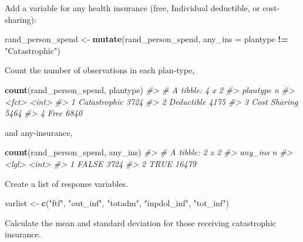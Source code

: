 \documentclass[]{book}
\newenvironment{Shaded}{\begin{snugshade}}{\end{snugshade}}
\newcommand{\CommentTok}[1]{\textcolor[rgb]{0.56,0.35,0.01}{\textit{#1}}}
\newcommand{\DataTypeTok}[1]{\textcolor[rgb]{0.13,0.29,0.53}{#1}}
\newcommand{\KeywordTok}[1]{\textcolor[rgb]{0.13,0.29,0.53}{\textbf{#1}}}
\newcommand{\NormalTok}[1]{#1}
\newcommand{\OperatorTok}[1]{\textcolor[rgb]{0.81,0.36,0.00}{\textbf{#1}}}
\newcommand{\StringTok}[1]{\textcolor[rgb]{0.31,0.60,0.02}{#1}}
\theoremstyle{definition}
\theoremstyle{definition}
\theoremstyle{definition}
\theoremstyle{remark}
\begin{document}
Add a variable for any health insurance (free, Individual deductible, or
cost-sharing):

\begin{Shaded}
\begin{Highlighting}[]
\NormalTok{rand_person_spend <-}\StringTok{ }\KeywordTok{mutate}\NormalTok{(rand_person_spend,}
                            \DataTypeTok{any_ins =}\NormalTok{ plantype }\OperatorTok{!=}\StringTok{ "Catastrophic"}\NormalTok{)}
\end{Highlighting}
\end{Shaded}

Count the number of observations in each plan-type,

\begin{Shaded}
\begin{Highlighting}[]
\KeywordTok{count}\NormalTok{(rand_person_spend, plantype)}
\CommentTok{#> # A tibble: 4 x 2}
\CommentTok{#>   plantype         n}
\CommentTok{#>   <fct>        <int>}
\CommentTok{#> 1 Catastrophic  3724}
\CommentTok{#> 2 Deductible    4175}
\CommentTok{#> 3 Cost Sharing  5464}
\CommentTok{#> 4 Free          6840}
\end{Highlighting}
\end{Shaded}

and any-insurance,

\begin{Shaded}
\begin{Highlighting}[]
\KeywordTok{count}\NormalTok{(rand_person_spend, any_ins)}
\CommentTok{#> # A tibble: 2 x 2}
\CommentTok{#>   any_ins     n}
\CommentTok{#>   <lgl>   <int>}
\CommentTok{#> 1 FALSE    3724}
\CommentTok{#> 2 TRUE    16479}
\end{Highlighting}
\end{Shaded}

Create a list of response variables.

\begin{Shaded}
\begin{Highlighting}[]
\NormalTok{varlist <-}\StringTok{ }\KeywordTok{c}\NormalTok{(}\StringTok{"ftf"}\NormalTok{, }\StringTok{"out_inf"}\NormalTok{, }\StringTok{"totadm"}\NormalTok{, }\StringTok{"inpdol_inf"}\NormalTok{, }\StringTok{"tot_inf"}\NormalTok{)}
\end{Highlighting}
\end{Shaded}

Calculate the mean and standard deviation for those receiving
catastrophic insurance.
\end{document}
